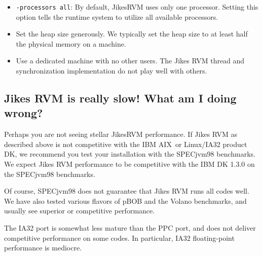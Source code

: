 \begin{itemize}
\item {\tt -processors all}: By default, Jikes\trademark RVM uses only
one processor.  Setting this option tells the runtime system to
utilize all available processors. 
\item Set the heap size generously.  We typically set the heap size to
at least half the physical memory on a machine. 
\item Use a dedicated machine with no other users.  The Jikes RVM
thread and synchronization implementation do not play well with
others. 
\end{itemize}

\JikesTMFooter

\subsection{Jikes RVM is really slow! What am I doing wrong?}

Perhaps you are not seeing stellar Jikes\trademark RVM performance.
If Jikes RVM as described above is not competitive with the IBM
AIX\AIXTMFootnote\ or Linux/IA32 product DK, we recommend you test
your installation with the SPECjvm98 benchmarks.  We expect Jikes RVM
performance to be competitive with the IBM DK 1.3.0 on the SPECjvm98
benchmarks.

Of course, SPECjvm98 does not guarantee that Jikes RVM runs all codes
well.  We have also tested various flavors of pBOB and the Volano
benchmarks, and usually see superior or competitive performance.

The IA32 port is somewhat less mature than the PPC port, and does not
deliver competitive performance on some codes.  In particular, IA32
floating-point performance is mediocre.

